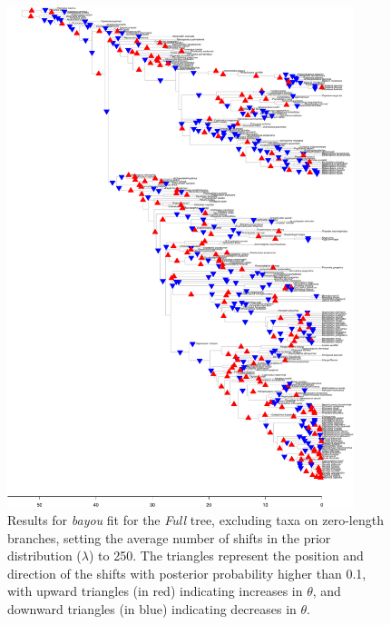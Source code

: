\begin{figure}[H]
\includegraphics[width=0.9\textwidth]{img/plots-full-k250-1.pdf}
\caption{Results for \textit{bayou} fit for the \textit{Full} tree, excluding taxa on zero-length branches, setting the average number of shifts in the prior distribution ($\lambda$) to 250. The triangles represent the position and direction of the shifts with posterior probability higher than 0.1, with upward triangles (in red) indicating increases in $\theta$, and downward triangles (in blue) indicating decreases in $\theta$.}
\label{fig:full-k250-nzlb}
\end{figure}

\newpage

